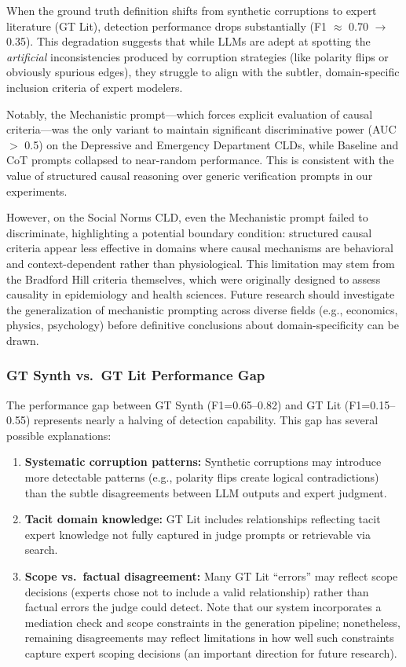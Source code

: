 When the ground truth definition shifts from synthetic corruptions to expert literature (GT Lit), detection performance drops substantially (F1 $\approx$ 0.70 $\rightarrow$ 0.35). This degradation suggests that while LLMs are adept at spotting the \textit{artificial} inconsistencies produced by corruption strategies (like polarity flips or obviously spurious edges), they struggle to align with the subtler, domain-specific inclusion criteria of expert modelers.

Notably, the Mechanistic prompt---which forces explicit evaluation of causal criteria---was the only variant to maintain significant discriminative power (AUC $>$ 0.5) on the Depressive and Emergency Department CLDs, while Baseline and CoT prompts collapsed to near-random performance. This is consistent with the value of structured causal reasoning over generic verification prompts in our experiments.

However, on the Social Norms CLD, even the Mechanistic prompt failed to discriminate, highlighting a potential boundary condition: structured causal criteria appear less effective in domains where causal mechanisms are behavioral and context-dependent rather than physiological. This limitation may stem from the Bradford Hill criteria themselves, which were originally designed to assess causality in epidemiology and health sciences. Future research should investigate the generalization of mechanistic prompting across diverse fields (e.g., economics, physics, psychology) before definitive conclusions about domain-specificity can be drawn.

\subsubsection{GT Synth vs.\ GT Lit Performance Gap}

The performance gap between GT Synth (F1=0.65--0.82) and GT Lit (F1=0.15--0.55) represents nearly a halving of detection capability. This gap has several possible explanations:

\begin{enumerate}[noitemsep]
    \item \textbf{Systematic corruption patterns:} Synthetic corruptions may introduce more detectable patterns (e.g., polarity flips create logical contradictions) than the subtle disagreements between LLM outputs and expert judgment.
    \item \textbf{Tacit domain knowledge:} GT Lit includes relationships reflecting tacit expert knowledge not fully captured in judge prompts or retrievable via search.
    \item \textbf{Scope vs.\ factual disagreement:} Many GT Lit ``errors'' may reflect scope decisions (experts chose not to include a valid relationship) rather than factual errors the judge could detect. Note that our system incorporates a mediation check and scope constraints in the generation pipeline; nonetheless, remaining disagreements may reflect limitations in how well such constraints capture expert scoping decisions (an important direction for future research).
\end{enumerate}

